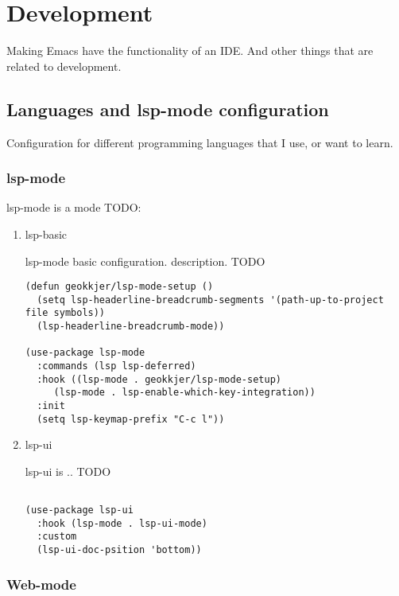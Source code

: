 \documentclass[11pt]{article}
\begin{document}
\section{Development}
\label{sec:org65cc1ec}

Making Emacs have the functionality of an IDE. And other things that are related to development.

\subsection{Languages and lsp-mode configuration}
\label{sec:orgdfcb018}

Configuration for different programming languages that I use, or want to learn.

\subsubsection{lsp-mode}
\label{sec:orgfea5cbe}

lsp-mode is a mode TODO:

\begin{enumerate}
\item lsp-basic
\label{sec:orgd0fa6e0}

lsp-mode basic configuration. description. TODO

\begin{verbatim}
(defun geokkjer/lsp-mode-setup ()
  (setq lsp-headerline-breadcrumb-segments '(path-up-to-project file symbols))
  (lsp-headerline-breadcrumb-mode))

(use-package lsp-mode
  :commands (lsp lsp-deferred)
  :hook ((lsp-mode . geokkjer/lsp-mode-setup)
	 (lsp-mode . lsp-enable-which-key-integration))
  :init
  (setq lsp-keymap-prefix "C-c l"))

\end{verbatim}

\item lsp-ui
\label{sec:org6b272c2}

lsp-ui is .. TODO

\begin{verbatim}

(use-package lsp-ui
  :hook (lsp-mode . lsp-ui-mode)
  :custom
  (lsp-ui-doc-psition 'bottom))

\end{verbatim}
\end{enumerate}

\subsubsection{Web-mode}
\label{sec:org3c698f3}
\end{document}
